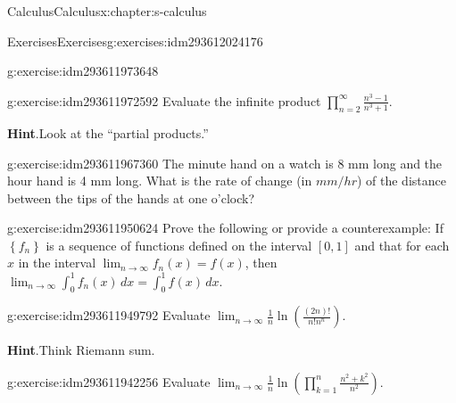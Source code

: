 \documentclass[twoside,10pt,]{book}
\newcommand{\blocktitlefont}{\relax}
\numberwithin{equation}{section}
\begin{document}
\begin{chapterptx}{Calculus}{}{Calculus}{}{}{x:chapter:s-calculus}
\begin{exercises-section}{Exercises}{}{Exercises}{}{}{g:exercises:idm293612024176}
\begin{divisionexercise}{10}{}{}{g:exercise:idm293611973648}
\end{divisionexercise}%
\begin{divisionexercise}{11}{}{}{g:exercise:idm293611972592}%
Evaluate the infinite product \(\prod _{n=2}^{\infty } \frac{n^3-1}{n^3+1}\).%
\par\smallskip%
\noindent\textbf{\blocktitlefont Hint}.\label{g:hint:idm293611968288}{}\hypertarget{g:hint:idm293611968288}{}\quad{}Look at the ``partial products.''%
\end{divisionexercise}%
\begin{divisionexercise}{12}{}{}{g:exercise:idm293611967360}%
The minute hand on a watch is 8 mm long and the hour hand is 4 mm long. What is the rate of change (in \(mm/hr\)) of  the distance between the tips of the hands at one o’clock?%
\end{divisionexercise}%
\begin{divisionexercise}{13}{}{}{g:exercise:idm293611950624}%
Prove the following or provide a counterexample:  If \(\left\{f_n\right\}\) is a sequence of functions defined on the interval \([0,1]\) and that for each \(x\) in the interval \(\lim_{n\to \infty } f_n(x) = f(x)\),  then    \(\lim_{n\to \infty } \int_0^1 f_n(x) \, dx=\int_0^1 f(x)
\, dx\).%
\end{divisionexercise}%
\begin{divisionexercise}{14}{}{}{g:exercise:idm293611949792}%
Evaluate \(\lim_{n \rightarrow \infty} \frac{1}{n}\ln{\left(\frac{(2n)!}{n! n^n}\right)}\).%
\par\smallskip%
\noindent\textbf{\blocktitlefont Hint}.\label{g:hint:idm293611945696}{}\hypertarget{g:hint:idm293611945696}{}\quad{}Think Riemann sum.%
\end{divisionexercise}%
\begin{divisionexercise}{15}{}{}{g:exercise:idm293611942256}%
Evaluate \(\lim_{n \rightarrow \infty} \frac{1}{n}\ln \left(\prod_{k=1}^{n} \frac{ n^2+k^2}{n^2}\right)\).%
\end{divisionexercise}%
\end{exercises-section}
\end{chapterptx}
%
%
\typeout{************************************************}
\typeout{************************************************}
%
\end{document}
